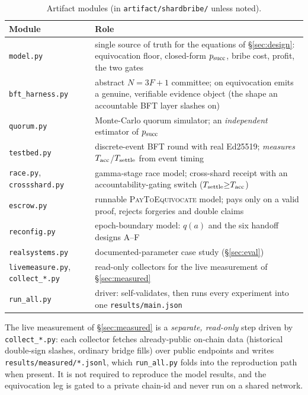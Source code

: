 \begin{table}[t]
\centering
\caption{Artifact modules (in \texttt{artifact/shardbribe/} unless noted).}
\label{tab:artifact}
\small
\begin{tabularx}{\linewidth}{@{}lX@{}}
\toprule
Module & Role \\
\midrule
\texttt{model.py} & single source of truth for the equations of \S\ref{sec:design}: equivocation floor, closed-form $p_{\mathrm{succ}}$, bribe cost, profit, the two gates \\
\texttt{bft\_harness.py} & abstract $N{=}3F{+}1$ committee; on equivocation emits a genuine, verifiable evidence object (the shape an accountable BFT layer slashes on) \\
\texttt{quorum.py} & Monte-Carlo quorum simulator; an \emph{independent} estimator of $p_{\mathrm{succ}}$ \\
\texttt{testbed.py} & discrete-event BFT round with real Ed25519; \emph{measures} $T_{\mathrm{acc}}$/$T_{\mathrm{settle}}$ from event timing \\
\texttt{race.py}, \texttt{crossshard.py} & gamma-stage race model; cross-shard receipt with an accountability-gating switch ($T_{\mathrm{settle}}{\ge}T_{\mathrm{acc}}$) \\
\texttt{escrow.py} & runnable \textsc{PayToEquivocate} model; pays only on a valid proof, rejects forgeries and double claims \\
\texttt{reconfig.py} & epoch-boundary model: $q(a)$ and the six handoff designs A--F \\
\texttt{realsystems.py} & documented-parameter case study (\S\ref{sec:eval}) \\
\texttt{livemeasure.py}, \texttt{collect\_*.py} & read-only collectors for the live measurement of \S\ref{sec:measured} \\
\texttt{run\_all.py} & driver: self-validates, then runs every experiment into one \texttt{results/main.json} \\
\bottomrule
\end{tabularx}
\end{table}

The live measurement of \S\ref{sec:measured} is a \emph{separate, read-only} step driven by
\texttt{collect\_*.py}: each collector fetches already-public on-chain data (historical double-sign
slashes, ordinary bridge fills) over public endpoints and writes \texttt{results/measured/*.jsonl},
which \texttt{run\_all.py} folds into the reproduction path when present. It is not required to
reproduce the model results, and the equivocation leg is gated to a private chain-id and never run on
a shared network.

